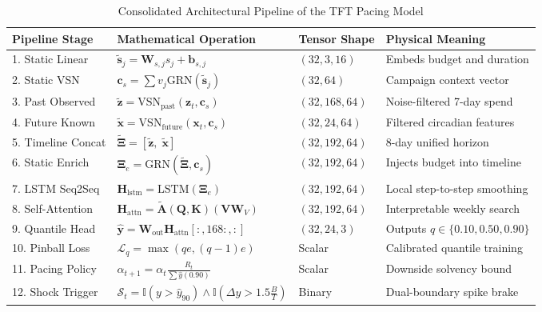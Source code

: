 \documentclass[11pt,a4paper]{article}
\begin{document}
\begin{table}[htbp]
\centering
\caption{Consolidated Architectural Pipeline of the TFT Pacing Model}
\label{tab:complete_summary}
\small
\begin{tabular}{llll}
\toprule
\textbf{Pipeline Stage} & \textbf{Mathematical Operation} & \textbf{Tensor Shape} & \textbf{Physical Meaning} \\
\midrule
1. Static Linear & $\tilde{\mathbf{s}}_j = \mathbf{W}_{s,j} s_j + \mathbf{b}_{s,j}$ & $(32, 3, 16)$ & Embeds budget and duration \\
2. Static VSN & $\mathbf{c}_s = \sum v_j \mathrm{GRN}(\tilde{\mathbf{s}}_j)$ & $(32, 64)$ & Campaign context vector \\
3. Past Observed & $\tilde{\mathbf{z}} = \mathrm{VSN}_{\text{past}}(\mathbf{z}_t, \mathbf{c}_s)$ & $(32, 168, 64)$ & Noise-filtered 7-day spend \\
4. Future Known & $\tilde{\mathbf{x}} = \mathrm{VSN}_{\text{future}}(\mathbf{x}_t, \mathbf{c}_s)$ & $(32, 24, 64)$ & Filtered circadian features \\
5. Timeline Concat & $\tilde{\mathbf{\Xi}} = [\tilde{\mathbf{z}}, \; \tilde{\mathbf{x}}]$ & $(32, 192, 64)$ & 8-day unified horizon \\
6. Static Enrich & $\mathbf{\Xi}_e = \mathrm{GRN}(\tilde{\mathbf{\Xi}}, \mathbf{c}_s)$ & $(32, 192, 64)$ & Injects budget into timeline \\
7. LSTM Seq2Seq & $\mathbf{H}_{\text{lstm}} = \mathrm{LSTM}(\mathbf{\Xi}_e)$ & $(32, 192, 64)$ & Local step-to-step smoothing \\
8. Self-Attention & $\mathbf{H}_{\text{attn}} = \tilde{\mathbf{A}}(\mathbf{Q}, \mathbf{K}) (\mathbf{V}\mathbf{W}_V)$ & $(32, 192, 64)$ & Interpretable weekly search \\
9. Quantile Head & $\hat{\mathbf{y}} = \mathbf{W}_{\text{out}} \mathbf{H}_{\text{attn}}[:, 168:, :]$ & $(32, 24, 3)$ & Outputs $q \in \{0.10, 0.50, 0.90\}$ \\
10. Pinball Loss & $\mathcal{L}_q = \max(q e, (q-1)e)$ & Scalar & Calibrated quantile training \\
11. Pacing Policy & $\alpha_{t+1} = \alpha_t \frac{R_t}{\sum \hat{y}(0.90)}$ & Scalar & Downside solvency bound \\
12. Shock Trigger & $\mathcal{S}_t = \mathbb{I}(y > \hat{y}_{90}) \land \mathbb{I}(\Delta y > 1.5 \frac{B}{T})$ & Binary & Dual-boundary spike brake \\
\bottomrule
\end{tabular}
\end{table}
\end{document}
